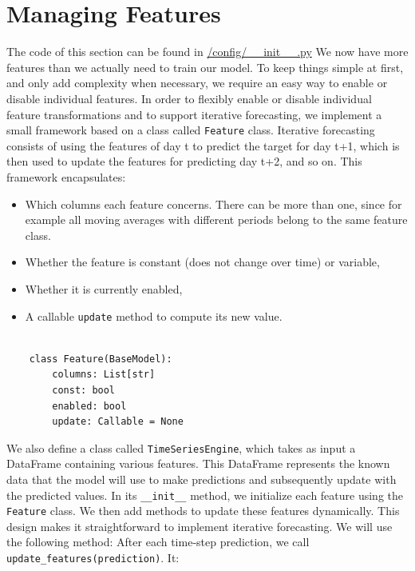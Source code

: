 \documentclass{Configuration_Files/PoliMi3i_thesis}
\begin{document}
\section{Managing Features}
The code of this section can be found in \href{https://github.com/SiniscalchiCarlo/piccolo_teatro/blob/develop/piccolo_teatro/config/__init__.py}{/config/\_\_init\_\_.py}
We now have more features than we actually need to train our model.
To keep things simple at first, and only add complexity when necessary, we require an easy way to
enable or disable individual features.
In order to flexibly enable or disable individual feature transformations and to support iterative forecasting, we implement a small framework based on a class called \texttt{Feature} class. 
Iterative forecasting consists of using the features of day t to predict the target for day t+1, which is then used to update the features for predicting day t+2, and so on.
This framework encapsulates:

\begin{itemize}
	\item Which columns each feature concerns. There can be more than one, since for example all moving averages with different periods belong to the same feature class.
	\item Whether the feature is constant (does not change over time) or variable,
	\item Whether it is currently enabled,
	\item A callable \texttt{update} method to compute its new value.
\end{itemize}

\begin{verbatim}

    class Feature(BaseModel):
        columns: List[str]
        const: bool
        enabled: bool
        update: Callable = None

    \end{verbatim}
    
We also define a class called \texttt{TimeSeriesEngine}, which takes as input a DataFrame containing various features. This DataFrame represents the known data that the model will use to make predictions and subsequently update with the predicted values. In its \texttt{\_\_init\_\_} method, we initialize each feature using the \texttt{Feature} class. We then add methods to update these features dynamically. This design makes it straightforward to implement iterative forecasting. We will use the following method:
After each time‐step prediction, we call \texttt{update\_features(prediction)}. It:
\end{document}
